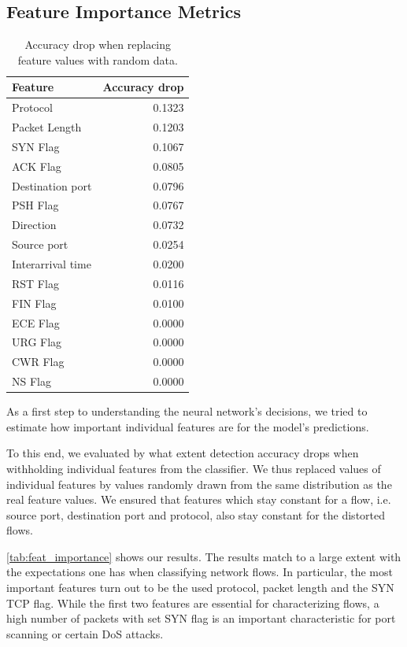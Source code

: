 \documentclass[sigconf,nonacm]{acmart}
\begin{document}
\subsection{Feature Importance Metrics}
\begin{table}
\caption{Accuracy drop when replacing feature values with random data.}
\label{tab:feat_importance}
\begin{tabular}{l r}
\toprule
Feature & Accuracy drop \\ \midrule
Protocol	&	0.1323	\\
Packet Length	&	0.1203	\\
SYN Flag	&	0.1067	\\
ACK Flag	&	0.0805	\\
Destination port	&	0.0796	\\
PSH Flag	&	0.0767	\\
Direction	&	0.0732	\\
Source port	&	0.0254	\\
Interarrival time	&	0.0200	\\
RST Flag	&	0.0116	\\
FIN Flag	&	0.0100	\\
ECE	Flag &	0.0000	\\
URG Flag	&	0.0000	\\
CWR Flag	&	0.0000	\\
NS Flag	&	0.0000	\\
\bottomrule
\end{tabular}
\end{table}
As a first step to understanding the neural network's decisions, we tried to estimate how important individual features are for the model's predictions.

To this end, we evaluated by what extent detection accuracy drops when withholding individual features from the classifier. We thus replaced values of individual features by values randomly drawn from the same distribution as the real feature values. We ensured that features which stay constant for a flow, i.e. source port, destination port and protocol, also stay constant for the distorted flows.

\autoref{tab:feat_importance} shows our results. The results match to a large extent with the expectations one has when classifying network flows. In particular,  the most important features turn out to be the used protocol, packet length and the SYN TCP flag. While the first two features are essential for characterizing flows, a high number of packets with set SYN flag is an important characteristic for port scanning or certain DoS attacks.
\end{document}
